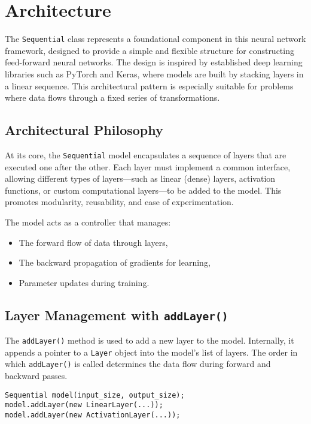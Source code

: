 \section{Architecture}


The \texttt{Sequential} class represents a foundational component in this neural network framework, designed to provide a simple and flexible structure for constructing feed-forward neural networks. The design is inspired by established deep learning libraries such as PyTorch and Keras, where models are built by stacking layers in a linear sequence. This architectural pattern is especially suitable for problems where data flows through a fixed series of transformations.

\subsection{Architectural Philosophy}

At its core, the \texttt{Sequential} model encapsulates a sequence of layers that are executed one after the other. Each layer must implement a common interface, allowing different types of layers—such as linear (dense) layers, activation functions, or custom computational layers—to be added to the model. This promotes modularity, reusability, and ease of experimentation.

The model acts as a controller that manages:
\begin{itemize}
    \item The forward flow of data through layers,
    \item The backward propagation of gradients for learning,
    \item Parameter updates during training.
\end{itemize}

\subsection{Layer Management with \texttt{addLayer()}}

The \texttt{addLayer()} method is used to add a new layer to the model. Internally, it appends a pointer to a \texttt{Layer} object into the model’s list of layers. The order in which \texttt{addLayer()} is called determines the data flow during forward and backward passes.

\begin{verbatim}
Sequential model(input_size, output_size);
model.addLayer(new LinearLayer(...));
model.addLayer(new ActivationLayer(...));
\end{verbatim}

